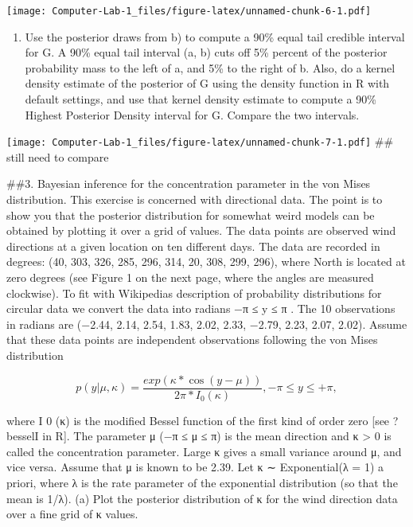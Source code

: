 \documentclass[]{article}
\providecommand{\tightlist}{%
  \setlength{\itemsep}{0pt}\setlength{\parskip}{0pt}}
\begin{document}
\texttt{[image: Computer-Lab-1\_files/figure-latex/unnamed-chunk-6-1.pdf]}

\begin{enumerate}
\def\labelenumi{(\alph{enumi})}
\setcounter{enumi}{2}
\tightlist
\item
  Use the posterior draws from b) to compute a 90\% equal tail credible
  interval for G. A 90\% equal tail interval (a, b) cuts off 5\% percent
  of the posterior probability mass to the left of a, and 5\% to the
  right of b. Also, do a kernel density estimate of the posterior of G
  using the density function in R with default settings, and use that
  kernel density estimate to compute a 90\% Highest Posterior Density
  interval for G. Compare the two intervals.
\end{enumerate}

\texttt{[image: Computer-Lab-1\_files/figure-latex/unnamed-chunk-7-1.pdf]}
\#\# still need to compare

\#\#3. Bayesian inference for the concentration parameter in the von
Mises distribution. This exercise is concerned with directional data.
The point is to show you that the posterior distribution for somewhat
weird models can be obtained by plotting it over a grid of values. The
data points are observed wind directions at a given location on ten
different days. The data are recorded in degrees: (40, 303, 326, 285,
296, 314, 20, 308, 299, 296), where North is located at zero degrees
(see Figure 1 on the next page, where the angles are measured
clockwise). To fit with Wikipedias description of probability
distributions for circular data we convert the data into radians −π ≤ y
≤ π . The 10 observations in radians are (−2.44, 2.14, 2.54, 1.83, 2.02,
2.33, −2.79, 2.23, 2.07, 2.02). Assume that these data points are
independent observations following the von Mises distribution

\[p(y|\mu,\kappa) = \frac{exp(\kappa*\cos(y-\mu))}{2\pi*I_0(\kappa)}, -\pi \leq y \leq +\pi,\]

where I 0 (κ) is the modified Bessel function of the first kind of order
zero {[}see ?besselI in R{]}. The parameter μ (−π ≤ μ ≤ π) is the mean
direction and κ \textgreater{} 0 is called the concentration parameter.
Large κ gives a small variance around μ, and vice versa. Assume that μ
is known to be 2.39. Let κ ∼ Exponential(λ = 1) a priori, where λ is the
rate parameter of the exponential distribution (so that the mean is
1/λ). (a) Plot the posterior distribution of κ for the wind direction
data over a fine grid of κ values.
\end{document}
